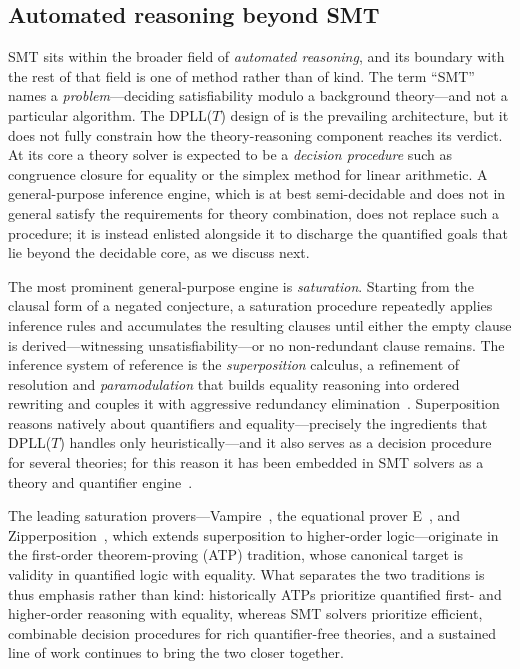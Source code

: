 \subsection{Automated reasoning beyond SMT}
\label{subsec:automated-reasoning}

SMT sits within the broader field of \emph{automated reasoning}, and its
boundary with the rest of that field is one of method rather than of kind.
The term ``SMT'' names a \emph{problem}---deciding satisfiability modulo a
background theory---and not a particular algorithm.
The DPLL(\(T\)) design of  is the prevailing
architecture, but it does not fully constrain how the theory-reasoning component
reaches its verdict. At its core a theory solver is expected to be a
\emph{decision procedure} such as congruence closure for equality or the
simplex method for linear arithmetic. A general-purpose inference engine, which
is at best semi-decidable and does not in general satisfy the requirements for
theory combination, does not replace such a procedure; it is instead enlisted
alongside it to discharge the quantified goals that lie beyond the decidable
core, as we discuss next.

The most prominent general-purpose engine is \emph{saturation}.
Starting from the clausal form of a negated conjecture, a saturation procedure
repeatedly applies inference rules and accumulates the resulting clauses until
either the empty clause is derived---witnessing unsatisfiability---or no
non-redundant clause remains.
The inference system of reference is the \emph{superposition} calculus, a
refinement of resolution and \emph{paramodulation} that builds equality reasoning
into ordered rewriting and couples it with aggressive redundancy
elimination~\cite{bachmair1994superposition,nieuwenhuis2001paramodulation}.
Superposition reasons natively about quantifiers and equality---precisely the
ingredients that DPLL(\(T\)) handles only heuristically---and it also serves as a
decision procedure for several theories; for this reason it has been embedded in
SMT solvers as a theory and quantifier engine~\cite{demoura2008engineering}.

The leading saturation provers---Vampire~\cite{kovacs2013vampire}, the equational
prover E~\cite{schulz2013e}, and Zipperposition~\cite{bentkamp2023higherorder},
which extends superposition to higher-order logic---originate in the first-order
theorem-proving (ATP) tradition, whose canonical target is validity in quantified
logic with equality.
What separates the two traditions is thus emphasis rather than kind: historically
ATPs prioritize quantified first- and higher-order reasoning with equality,
whereas SMT solvers prioritize efficient, combinable decision procedures for rich
quantifier-free theories, and a sustained line of work continues to bring the two
closer together.

